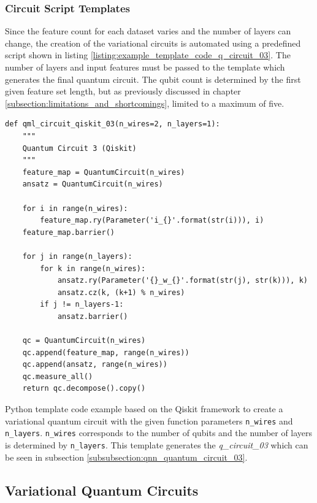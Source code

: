 \subsubsection{Circuit Script Templates}
Since the feature count for each dataset varies and the number of layers can change, the creation of the variational circuits is automated using a predefined script shown in listing \ref{listing:example_template_code_q_circuit_03}. The number of layers and input features must be passed to the template which generates the final quantum circuit. The qubit count is determined by the first given feature set length, but as previously discussed in chapter \ref{subsection:limitations_and_shortcomings}, limited to a maximum of five.

\begin{listing}[!ht]
    \begin{verbatim}
def qml_circuit_qiskit_03(n_wires=2, n_layers=1):
    """
    Quantum Circuit 3 (Qiskit)
    """
    feature_map = QuantumCircuit(n_wires)
    ansatz = QuantumCircuit(n_wires)

    for i in range(n_wires):
        feature_map.ry(Parameter('i_{}'.format(str(i))), i)
    feature_map.barrier()

    for j in range(n_layers):
        for k in range(n_wires):
            ansatz.ry(Parameter('{}_w_{}'.format(str(j), str(k))), k)
            ansatz.cz(k, (k+1) % n_wires)
        if j != n_layers-1:
            ansatz.barrier()

    qc = QuantumCircuit(n_wires)
    qc.append(feature_map, range(n_wires))
    qc.append(ansatz, range(n_wires))
    qc.measure_all()
    return qc.decompose().copy()
    \end{verbatim}
    \caption{Python template code example based on the Qiskit framework\cite{Qiskit} to create a variational quantum circuit with the given function parameters \texttt{n_wires} and \texttt{n_layers}. \texttt{n_wires} corresponds to the number of qubits and the number of layers is determined by \texttt{n_layers}. This template generates the \textit{q\_circuit\_03} which can be seen in subsection \ref{subsubsection:qnn_quantum_circuit_03}.}
    \label{listing:example_template_code_q_circuit_03}
\end{listing}

\clearpage

\subsection{Variational Quantum Circuits}
\label{subsection:qnn_quantum_circuits}

